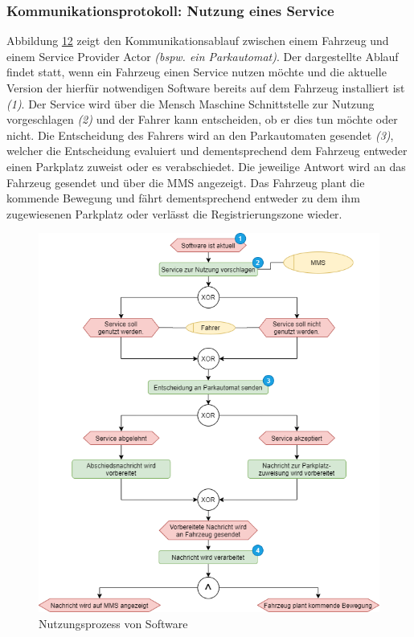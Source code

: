 \subsubsection{Kommunikationsprotokoll: Nutzung eines Service}
Abbildung \hyperref[img:nutzung]{12} zeigt den Kommunikationsablauf zwischen einem Fahrzeug und einem Service Provider Actor \textit{(bspw. ein Parkautomat)}. Der dargestellte Ablauf findet statt, wenn ein Fahrzeug einen Service nutzen möchte und die aktuelle Version der hierfür notwendigen Software bereits auf dem Fahrzeug installiert ist \textit{(1)}. Der Service wird über die Mensch Maschine Schnittstelle zur Nutzung vorgeschlagen \textit{(2)} und der Fahrer kann entscheiden, ob er dies tun möchte oder nicht. Die Entscheidung des Fahrers wird an den Parkautomaten gesendet \textit{(3)}, welcher die Entscheidung evaluiert und dementsprechend dem Fahrzeug entweder einen Parkplatz zuweist oder es verabschiedet. Die jeweilige Antwort wird an das Fahrzeug gesendet und über die MMS angezeigt. Das Fahrzeug plant die kommende Bewegung und fährt dementsprechend entweder zu dem ihm zugewiesenen Parkplatz oder verlässt die Registrierungszone wieder.
\begin{figure}[!h]
	\centering
	\includegraphics[width=0.8\columnwidth]{pictures/konzept-Nutzungsprozess.png}
	\caption{Nutzungsprozess von Software}
	\label{img:nutzung}
\end{figure}
\clearpage
